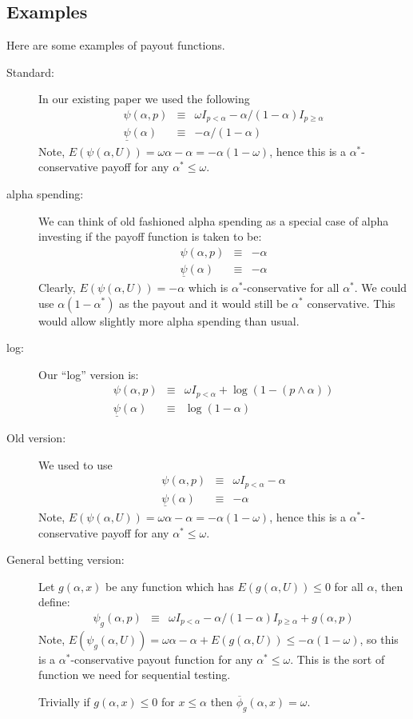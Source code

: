 \documentclass[12pt]{article}
\begin{document}
\subsection*{Examples}
Here are some examples of payout functions.  
\begin{description}
\item[Standard:] In our existing paper we used the following
\begin{eqnarray*}
\psi(\alpha,p) &\equiv&
 \omega I_{p < \alpha} - \alpha/(1-\alpha) I_{p\ge
 \alpha}\\
\underline{\psi}(\alpha) &\equiv&- \alpha/(1-\alpha)
\end{eqnarray*}
Note, $E(\psi(\alpha,U)) = \omega \alpha - \alpha =
-\alpha(1-\omega)$, hence this is a $\alpha^*$-conservative payoff for
any $\alpha^* \le \omega$.

\item[alpha spending:] We can think of old fashioned alpha spending as
a special case of alpha investing if the payoff function is taken to
be: 
\begin{eqnarray*}
\psi(\alpha,p) &\equiv& -\alpha\\
\underline{\psi}(\alpha) &\equiv& -\alpha
\end{eqnarray*}
Clearly, $E(\psi(\alpha,U)) = -\alpha$ which is
 $\alpha^*$-conservative for all $\alpha^*$.  We could use $\alpha(1 -
 \alpha^*)$ as the payout and it would still be $\alpha^*$
 conservative.  This would allow slightly more alpha spending than
 usual.

\item[log:] Our ``log'' version is:
\begin{eqnarray*}
\psi(\alpha,p) &\equiv&  \omega I_{p < \alpha} + \log(1 - (p \wedge
\alpha)) \\
\underline{\psi}(\alpha) &\equiv& \log(1 - \alpha)
\end{eqnarray*}
\item[Old version:] We used to use
\begin{eqnarray*}
\psi(\alpha,p) &\equiv&
 \omega I_{p < \alpha} - \alpha\\
\underline{\psi}(\alpha) &\equiv&- \alpha
\end{eqnarray*}
Note, $E(\psi(\alpha,U)) = \omega \alpha - \alpha =
-\alpha(1-\omega)$, hence this is a $\alpha^*$-conservative payoff for
any $\alpha^* \le \omega$.

\item[General betting version:] Let $g(\alpha,x)$ be any function
which has $E(g(\alpha,U)) \le 0$ for all $\alpha$, then define:
\begin{eqnarray*}
\psi_g(\alpha,p) &\equiv&
 \omega I_{p < \alpha} - \alpha/(1-\alpha) I_{p\ge
 \alpha} + g(\alpha,p)
\end{eqnarray*}
Note, $E(\psi_g(\alpha,U)) = \omega \alpha - \alpha + E(g(\alpha,U)) \le
-\alpha(1-\omega)$, so this is a $\alpha^*$-conservative payout
function for any $\alpha^* \le \omega$.  This is the sort of function
we need for sequential testing.

Trivially if $g(\alpha,x) \le 0$ for $x \le \alpha$ then
 $\overline{\phi}_g(\alpha,x) = \omega$.

\end{description}
\end{document}
